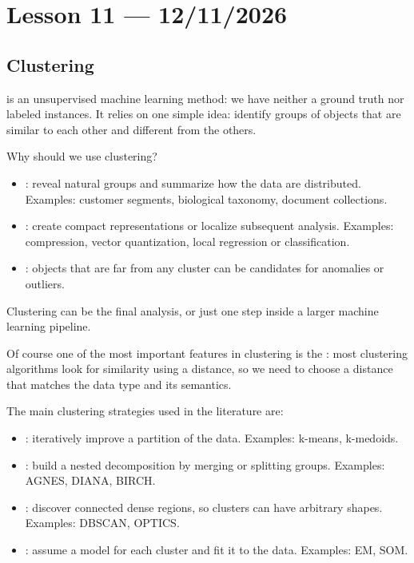 \section{Lesson 11 --- 12/11/2026}

\subsection{Clustering}

 is an unsupervised machine learning method: we have neither a ground truth nor labeled instances. It relies on one simple idea: identify groups of objects that are similar to each other and different from the others.

Why should we use clustering?
\begin{itemize}
  \item {}: reveal natural groups and summarize how the data are distributed. Examples: customer segments, biological taxonomy, document collections.
  \item {}: create compact representations or localize subsequent analysis. Examples: compression, vector quantization, local regression or classification.
  \item {}: objects that are far from any cluster can be candidates for anomalies or outliers.
\end{itemize}
Clustering can be the final analysis, or just one step inside a larger machine learning pipeline.

Of course one of the most important features in clustering is the : most clustering algorithms look for similarity using a distance, so we need to choose a distance that matches the data type and its semantics.

The main clustering strategies used in the literature are:
\begin{itemize}
  \item {}: iteratively improve a partition of the data. Examples: k-means, k-medoids.
  \item {}: build a nested decomposition by merging or splitting groups. Examples: AGNES, DIANA, BIRCH.
  \item {}: discover connected dense regions, so clusters can have arbitrary shapes. Examples: DBSCAN, OPTICS.
  \item {}: assume a model for each cluster and fit it to the data. Examples: EM, SOM.
\end{itemize}

